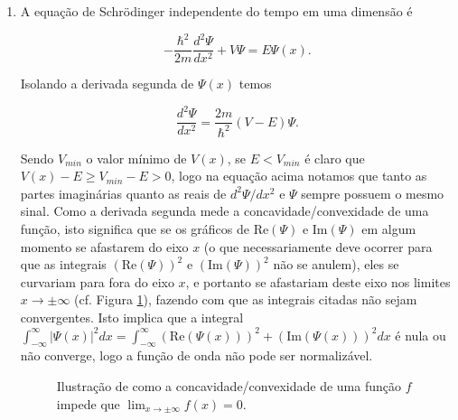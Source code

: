 \documentclass[a4paper, 12pt, notitlepage]{article}
\begin{document}
\begin{enumerate}
\begin{enumerate}
  \item A equação de Schrödinger independente do tempo em uma dimensão é

$$ -\frac{\hbar^2}{2m} \frac{d^2 \Psi}{dx^2} + V \Psi = E\Psi(x). $$

  Isolando a derivada segunda de $\Psi(x)$ temos

$$ \frac{d^2\Psi}{dx^2} = \frac{2m}{\hbar^2}\left(V - E\right)\Psi. $$

  Sendo $V_{min}$ o valor mínimo de $V(x)$, se $E < V_{min}$ é claro que $V(x) - E \ge V_{min} - E > 0$, logo na equação acima notamos que tanto as partes imaginárias quanto as reais de $d^2\Psi/dx^2$ e $\Psi$ sempre possuem o mesmo sinal. Como a derivada segunda mede a concavidade/convexidade de uma função, isto significa que se os gráficos de $\text{Re}(\Psi)$ e $\text{Im}(\Psi)$ em algum momento se afastarem do eixo $x$ (o que necessariamente deve ocorrer para que as integrais $\left(\text{Re}(\Psi)\right)^2$ e $\left(\text{Im}(\Psi)\right)^2$ não se anulem), eles se curvariam para fora do eixo $x$, e portanto se afastariam deste eixo nos limites $x \rightarrow \pm \infty$ (cf. Figura \ref{fig:ilustracao.concavidade}), fazendo com que as integrais citadas não sejam convergentes. Isto implica que a integral  $\int_{-\infty}^{\infty}|\Psi(x)|^2dx = \int_{-\infty}^{\infty}\left(\text{Re}\left(\Psi(x)\right)\right)^2 + \left(\text{Im}\left(\Psi(x)\right)\right)^2 dx$ é nula ou não converge, logo a função de onda não pode ser normalizável.


  \begin{figure}[!h]
    \centering
	  \caption{Ilustração de como a concavidade/convexidade de uma função $f$ impede que $\lim_{x \to \pm \infty} f(x) = 0$.}
	  \label{fig:ilustracao.concavidade}
  \end{figure}
\end{enumerate}


\end{enumerate}
\end{document}

